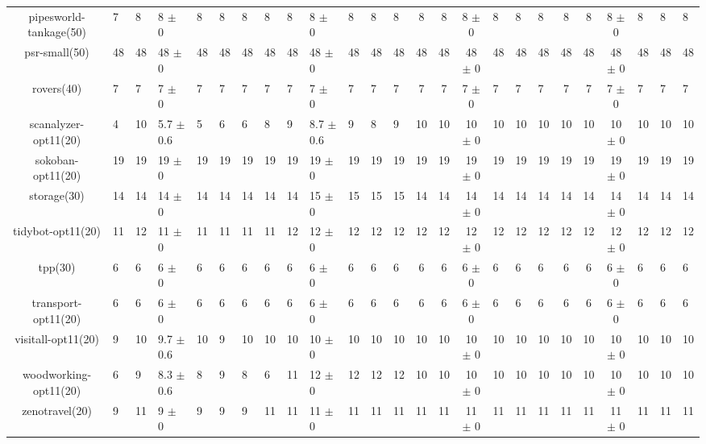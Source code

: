 \begin{center}
\begin{tabular}{|c|HHHHHHHHHHHHcccHHH|cccHHH|}
pipesworld-tankage(50) & 7 & 8 & 8 $\pm$ 0 & 8 & 8 & 8 & 8 & 8 & 8 $\pm$ 0 & 8 & 8 & 8 & 8 & 8 & 8 $\pm$ 0 & 8 & 8 & 8 & 8 & 8 & 8 $\pm$ 0 & 8 & 8 & 8\\
psr-small(50) & 48 & 48 & 48 $\pm$ 0 & 48 & 48 & 48 & 48 & 48 & 48 $\pm$ 0 & 48 & 48 & 48 & 48 & 48 & 48 $\pm$ 0 & 48 & 48 & 48 & 48 & 48 & 48 $\pm$ 0 & 48 & 48 & 48\\
rovers(40) & 7 & 7 & 7 $\pm$ 0 & 7 & 7 & 7 & 7 & 7 & 7 $\pm$ 0 & 7 & 7 & 7 & 7 & 7 & 7 $\pm$ 0 & 7 & 7 & 7 & 7 & 7 & 7 $\pm$ 0 & 7 & 7 & 7\\
scanalyzer-opt11(20) & 4 & 10 & 5.7 $\pm$ 0.6 & 5 & 6 & 6 & 8 & 9 & 8.7 $\pm$ 0.6 & 9 & 8 & 9 & 10 & 10 & 10 $\pm$ 0 & 10 & 10 & 10 & 10 & 10 & 10 $\pm$ 0 & 10 & 10 & 10\\
sokoban-opt11(20) & 19 & 19 & 19 $\pm$ 0 & 19 & 19 & 19 & 19 & 19 & 19 $\pm$ 0 & 19 & 19 & 19 & 19 & 19 & 19 $\pm$ 0 & 19 & 19 & 19 & 19 & 19 & 19 $\pm$ 0 & 19 & 19 & 19\\
storage(30) & 14 & 14 & 14 $\pm$ 0 & 14 & 14 & 14 & 14 & 14 & 15 $\pm$ 0 & 15 & 15 & 15 & 14 & 14 & 14 $\pm$ 0 & 14 & 14 & 14 & 14 & 14 & 14 $\pm$ 0 & 14 & 14 & 14\\
tidybot-opt11(20) & 11 & 12 & 11 $\pm$ 0 & 11 & 11 & 11 & 11 & 12 & 12 $\pm$ 0 & 12 & 12 & 12 & 12 & 12 & 12 $\pm$ 0 & 12 & 12 & 12 & 12 & 12 & 12 $\pm$ 0 & 12 & 12 & 12\\
tpp(30) & 6 & 6 & 6 $\pm$ 0 & 6 & 6 & 6 & 6 & 6 & 6 $\pm$ 0 & 6 & 6 & 6 & 6 & 6 & 6 $\pm$ 0 & 6 & 6 & 6 & 6 & 6 & 6 $\pm$ 0 & 6 & 6 & 6\\
transport-opt11(20) & 6 & 6 & 6 $\pm$ 0 & 6 & 6 & 6 & 6 & 6 & 6 $\pm$ 0 & 6 & 6 & 6 & 6 & 6 & 6 $\pm$ 0 & 6 & 6 & 6 & 6 & 6 & 6 $\pm$ 0 & 6 & 6 & 6\\
visitall-opt11(20) & 9 & 10 & 9.7 $\pm$ 0.6 & 10 & 9 & 10 & 10 & 10 & 10 $\pm$ 0 & 10 & 10 & 10 & 10 & 10 & 10 $\pm$ 0 & 10 & 10 & 10 & 10 & 10 & 10 $\pm$ 0 & 10 & 10 & 10\\
woodworking-opt11(20) & 6 & 9 & 8.3 $\pm$ 0.6 & 8 & 9 & 8 & 6 & 11 & 12 $\pm$ 0 & 12 & 12 & 12 & 10 & 10 & 10 $\pm$ 0 & 10 & 10 & 10 & 10 & 10 & 10 $\pm$ 0 & 10 & 10 & 10\\
zenotravel(20) & 9 & 11 & 9 $\pm$ 0 & 9 & 9 & 9 & 11 & 11 & 11 $\pm$ 0 & 11 & 11 & 11 & 11 & 11 & 11 $\pm$ 0 & 11 & 11 & 11 & 11 & 11 & 11 $\pm$ 0 & 11 & 11 & 11\\
\hline
\end{tabular}
\end{center}
